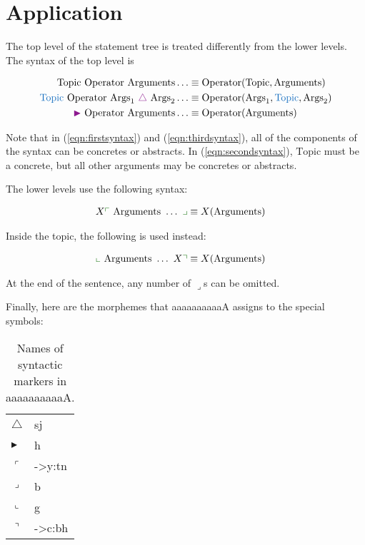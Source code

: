 \documentclass{book}
\newcommand{\lname}{aaaaaaaaaaA}
\begin{document}
\section{Application}

The top level of the statement tree is treated differently from the lower levels. The syntax of the top level is

\begin{align}
  \text{Topic } \text{Operator } \text{Arguments} \ldots &\equiv \text{Operator}(\text{Topic}, \text{Arguments})
  \label{eqn:firstsyntax} \\
  \hliii{\text{Topic }} \text{Operator } \text{Args}_1 \ \hli{\triangle}\  \text{Args}_2 \ldots
    &\equiv \text{Operator}(\text{Args}_1, \hliii{\text{Topic}}, \text{Args}_2)
  \label{eqn:secondsyntax} \\
  \hli{\blacktriangleright} \text{ Operator } \text{Arguments} \ldots &\equiv \text{Operator}(\text{Arguments})
  \label{eqn:thirdsyntax}
\end{align}

Note that in (\ref{eqn:firstsyntax}) and (\ref{eqn:thirdsyntax}), all of the components of the syntax can be concretes or abstracts. In (\ref{eqn:secondsyntax}), $\text{Topic}$ must be a concrete, but all other arguments may be concretes or abstracts.

The lower levels use the following syntax:

\begin{align}
  X\hlii{\ulcorner}\  \text{Arguments } \ldots\  \hlii{\lrcorner} &\equiv X(\text{Arguments})
\end{align}

Inside the topic, the following is used instead:

\begin{align}
  \hlii{\llcorner}\  \text{Arguments } \ldots\  X\hlii{\urcorner} &\equiv X(\text{Arguments})
\end{align}

At the end of the sentence, any number of $\lrcorner$s can be omitted.

Finally, here are the morphemes that \lname{} assigns to the special symbols:

\begin{table}[h]
  \caption{Names of syntactic markers in \lname.}
  \centering
  \begin{tabular}{l>{\kardinal}l}
    $\triangle$ & sj \\
    $\blacktriangleright$ & h \\
    $\ulcorner$ & ->y:tn \\
    $\lrcorner$ & b \\
    $\llcorner$ & g \\
    $\urcorner$ & ->c:bh \\
  \end{tabular}
\end{table}
\end{document}
